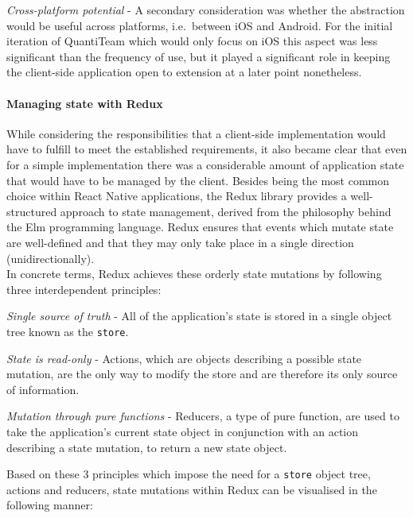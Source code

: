 \emph{Cross-platform potential} - A secondary consideration was whether
the abstraction would be useful across platforms, i.e.~between iOS and
Android. For the initial iteration of QuantiTeam which would only focus
on iOS this aspect was less significant than the frequency of use, but
it played a significant role in keeping the client-side application open
to extension at a later point nonetheless.

\paragraph{Managing state with Redux}\label{managing-state-with-redux}

While considering the responsibilities that a client-side implementation
would have to fulfill to meet the established requirements, it also
became clear that even for a simple implementation there was a
considerable amount of application state that would have to be managed
by the client. Besides being the most common choice within React Native
applications, the Redux library provides a well-structured approach to
state management, derived from the philosophy behind the Elm programming
language. Redux ensures that events which mutate state are well-defined
and that they may only take place in a single direction
(unidirectionally).\\
In concrete terms, Redux achieves these orderly state mutations by
following three interdependent
principles\cite{1redux}:

\emph{Single source of truth} - All of the application's state is stored
in a single object tree known as the \texttt{store}.

\emph{State is read-only} - Actions, which are objects describing a
possible state mutation, are the only way to modify the store and are
therefore its only source of information.

\emph{Mutation through pure functions} - Reducers, a type of pure
function, are used to take the application's current state object in
conjunction with an action describing a state mutation, to return a new
state object.

Based on these 3 principles which impose the need for a \texttt{store}
object tree, actions and reducers, state mutations within Redux can be
visualised in the following manner:

